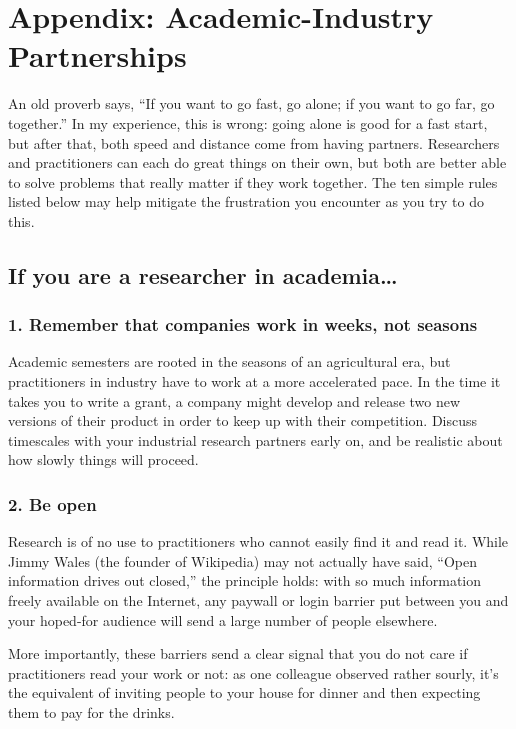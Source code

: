 \documentclass[10pt,letterpaper]{article}
\begin{document}
\section*{Appendix: Academic-Industry Partnerships}

An old proverb says, ``If you want to go fast, go alone; if you want to go far,
go together.''  In my experience, this is wrong: going alone is good for a fast
start, but after that, both speed and distance come from having partners.
Researchers and practitioners can each do great things on their own, but both
are better able to solve problems that really matter if they work together.
The ten simple rules listed below may help mitigate the
frustration you encounter as you try to do this.

\subsection*{If you are a researcher in academia{\ldots}}

\subsubsection*{1. Remember that companies work in weeks, not seasons}

Academic semesters are rooted in the seasons of an agricultural era, but
practitioners in industry have to work at a more accelerated pace. In the time
it takes you to write a grant, a company might develop and release two new
versions of their product in order to keep up with their competition. Discuss
timescales with your industrial research partners early on, and be realistic
about how slowly things will proceed.

\subsubsection*{2. Be open}

Research is of no use to practitioners who cannot easily find it and read
it. While Jimmy Wales (the founder of Wikipedia) may not actually have said,
``Open information drives out closed,'' the principle holds: with so much
information freely available on the Internet, any paywall or login barrier put
between you and your hoped-for audience will send a large number of people
elsewhere.

More importantly, these barriers send a clear signal that you do not care if
practitioners read your work or not: as one colleague observed rather sourly,
it's the equivalent of inviting people to your house for dinner and then
expecting them to pay for the drinks.
\end{document}
